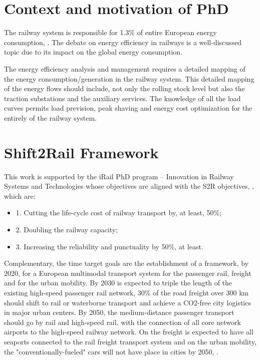 
\section{Context and motivation of PhD}

The railway system is responsible for 1.3\% of entire European energy consumption, \cite{iea-uic2016}. 
The debate on energy efficiency in railways is a well-discussed topic due to its impact on the global energy consumption.

The energy efficiency analysis and management requires a detailed mapping of the energy consumption/generation in the railway system. 
This detailed mapping of the energy flows should include, not only the rolling stock level but also the traction substations and the auxiliary services.
The knowledge of all the load curves permits load prevision, peak shaving and energy cost optimization for the entirely of the railway system.


\section{Shift2Rail Framework}

This work is supported by the iRail PhD program – Innovation in Railway Systems and Technologies whose objectives are aligned with the \ac{S2R} objectives, \cite{shift2rail2015}, which are: 

\begin{itemize}
	\setlength\itemsep{-0.5em}
	\item 1. Cutting the life-cycle cost of railway transport by, at least, 50\%;
	\item 2. Doubling the railway capacity;
	\item 3. Increasing the reliability and punctuality by 50\%, at least.
\end{itemize}

Complementary, the time target goals are the establishment of a framework, by 2020, for a European multimodal transport system for the passenger rail, freight and for the urban mobility. By 2030 is expected to triple the length of the existing high-speed passenger rail network, 30\% of the road freight over 300 km should shift to rail or waterborne transport and achieve a CO2-free city logistics in major urban centers. By 2050, the medium-distance passenger transport should go by rail and high-speed rail, with the connection of all core network airports to the high-speed railway network. On the freight is expected to have all seaports connected to the rail freight transport system and on the urban mobility, the "conventionally-fueled" cars will not have place in cities by 2050, \cite{shift2rail2015}.


